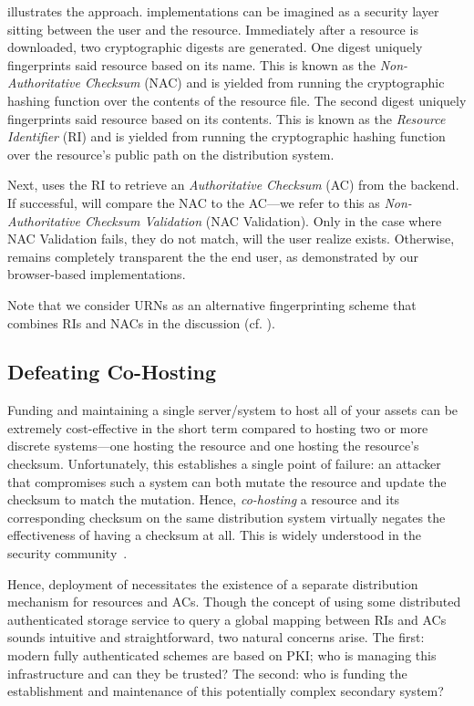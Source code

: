  illustrates the \SYSTEM{} approach. \SYSTEM{} implementations
can be imagined as a security layer sitting between the user and the resource.
Immediately after a resource is downloaded, two cryptographic digests are
generated. One digest uniquely fingerprints said resource based on its name.
This is known as the \emph{Non-Authoritative Checksum} (NAC) and is yielded from
running the cryptographic hashing function over the contents of the resource
file. The second digest uniquely fingerprints said resource based on its
contents. This is known as the \emph{Resource Identifier} (RI) and is yielded
from running the cryptographic hashing function over the resource's public path
on the distribution system.

Next, \SYSTEM{} uses the RI to retrieve an \emph{Authoritative Checksum} (AC)
from the backend. If successful, \SYSTEM{} will compare the NAC to the AC---we
refer to this as \emph{Non-Authoritative Checksum Validation} (NAC Validation).
Only in the case where NAC Validation fails, \ie they do not match, will the
user realize \SYSTEM{} exists. Otherwise, \SYSTEM{} remains completely
transparent the the end user, as demonstrated by our browser-based
implementations.

Note that we consider URNs as an alternative fingerprinting scheme that combines
RIs and NACs in the discussion (cf. ).

\subsection{Defeating Co-Hosting}

Funding and maintaining a single server/system to host all of your assets can be
extremely cost-effective in the short term compared to hosting two or more
discrete systems---one hosting the resource and one hosting the resource's
checksum. Unfortunately, this establishes a single point of failure: an attacker
that compromises such a system can both mutate the resource and update the
checksum to match the mutation. Hence, \emph{co-hosting} a resource and its
corresponding checksum on the same distribution system virtually negates the
effectiveness of having a checksum at all. This is widely understood in the
security community~\cite{SCA-MINT2}.

Hence, deployment of \SYSTEM{} necessitates the existence of a separate
distribution mechanism for resources and ACs. Though the concept of using some
distributed authenticated storage service to query a global mapping between RIs
and ACs sounds intuitive and straightforward, two natural concerns arise. The
first: modern fully authenticated schemes are based on PKI; who is managing this
infrastructure and can they be trusted? The second: who is funding the
establishment and maintenance of this potentially complex secondary system?

